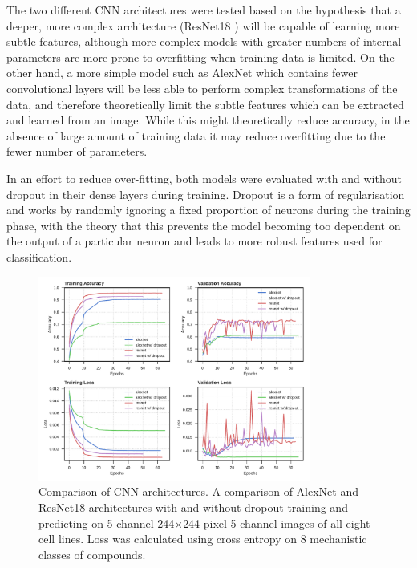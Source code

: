 \documentclass[a4paper,11pt,twoside,openright]{scrbook}
\begin{document}
The two different CNN architectures were tested based on the hypothesis that a deeper, more complex architecture (ResNet18 \cite{He2015}) will be capable of learning more subtle features, although more complex models with greater numbers of internal parameters are more prone to overfitting when training data is limited.
On the other hand, a more simple model such as AlexNet \cite{Krizhevsky2012} which contains fewer convolutional layers will be less able to perform complex transformations of the data, and therefore theoretically limit the subtle features which can be extracted and learned from an image.
While this might theoretically reduce accuracy, in the absence of large amount of training data it may reduce overfitting due to the fewer number of parameters.

In an effort to reduce over-fitting, both models were evaluated with and without dropout in their dense layers during training.
Dropout is a form of regularisation and works by randomly ignoring a fixed proportion of neurons during the training phase, with the theory that this prevents the model becoming too dependent on the output of a particular neuron and leads to more robust features used for classification.


\begin{figure}
    \includegraphics[width=0.8\textwidth]{ch2arch}
    \captionsetup{width=0.8\textwidth}
    \caption[Comparison of CNN architectures]{
Comparison of CNN architectures.
A comparison of AlexNet and ResNet18 architectures with and without dropout training and predicting on 5 channel 244$\times$244 pixel 5 channel images of all eight cell lines.
Loss was calculated using cross entropy on 8 mechanistic classes of compounds.}
    \label{figure:nn_arch}
\end{figure}
\end{document}
